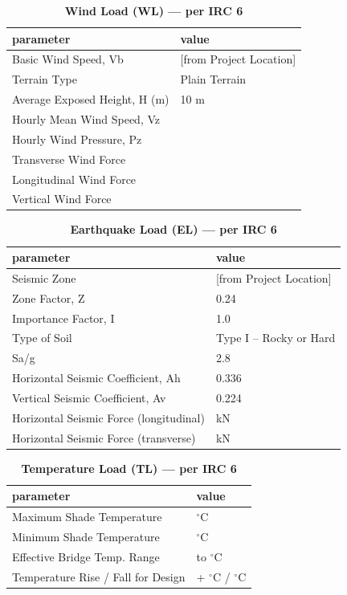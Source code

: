 \documentclass[12pt,a4paper]{report}
\numberwithin{table}{chapter}
\numberwithin{figure}{chapter}
\begin{document}
\vspace{1em}
\begin{longtable}{|L{5.5cm}|p{10.0cm}|}
\caption{\textbf{Wind Load (WL) --- per IRC 6}}
\hline
\textbf{parameter} & \textbf{value} \\
\hline
\textnormal{Basic Wind Speed, Vb} &  [from Project Location] \\[6pt]
\hline
\textnormal{Terrain Type} & Plain Terrain \\[6pt]
\hline
\textnormal{Average Exposed Height, H (m)} & 10 m \\[6pt]
\hline
\textnormal{Hourly Mean Wind Speed, Vz} &  \\[6pt]
\hline
\textnormal{Hourly Wind Pressure, Pz} &  \\[6pt]
\hline
\textnormal{Transverse Wind Force} &  \\[6pt]
\hline
\textnormal{Longitudinal Wind Force} &  \\[6pt]
\hline
\textnormal{Vertical Wind Force} &  \\[6pt]
\hline
\end{longtable}

\vspace{1em}
\begin{longtable}{|L{5.5cm}|p{10.0cm}|}
\caption{\textbf{Earthquake Load (EL) --- per IRC 6}}
\hline
\textbf{parameter} & \textbf{value} \\
\hline
\textnormal{Seismic Zone} &  [from Project Location] \\[6pt]
\hline
\textnormal{Zone Factor, Z} & 0.24 \\[6pt]
\hline
\textnormal{Importance Factor, I} & 1.0 \\[6pt]
\hline
\textnormal{Type of Soil} & Type I – Rocky or Hard \\[6pt]
\hline
\textnormal{Sa/g} & 2.8 \\[6pt]
\hline
\textnormal{Horizontal Seismic Coefficient, Ah} & 0.336 \\[6pt]
\hline
\textnormal{Vertical Seismic Coefficient, Av} & 0.224 \\[6pt]
\hline
\textnormal{Horizontal Seismic Force (longitudinal)} &  kN \\[6pt]
\hline
\textnormal{Horizontal Seismic Force (transverse)} &  kN \\[6pt]
\hline
\end{longtable}

\vspace{1em}
\begin{longtable}{|L{5.5cm}|p{10.0cm}|}
\caption{\textbf{Temperature Load (TL) --- per IRC 6}}
\hline
\textbf{parameter} & \textbf{value} \\
\hline
\textnormal{Maximum Shade Temperature} &  $^\circ$C \\[6pt]
\hline
\textnormal{Minimum Shade Temperature} &  $^\circ$C \\[6pt]
\hline
\textnormal{Effective Bridge Temp. Range} &  to  $^\circ$C \\[6pt]
\hline
\textnormal{Temperature Rise / Fall for Design} & + $^\circ$C / \textminus{} $^\circ$C \\[6pt]
\hline
\end{longtable}
\end{document}

